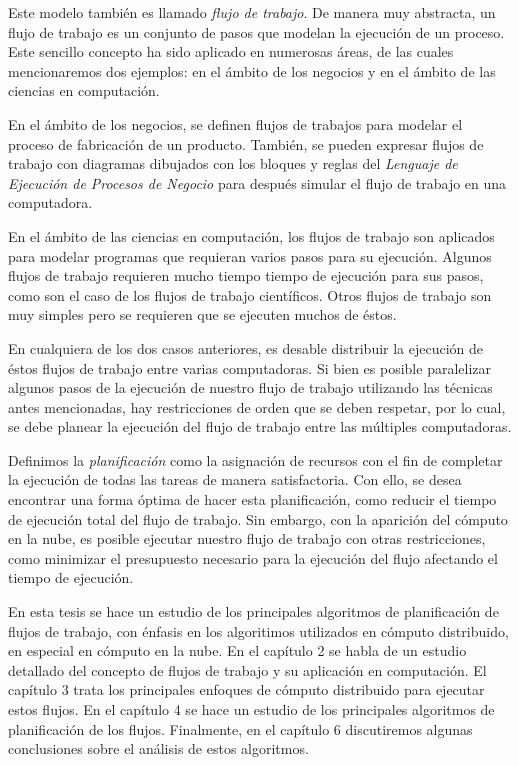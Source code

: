 Este modelo también es llamado \emph{flujo de trabajo}. De manera muy abstracta, un flujo de trabajo es un conjunto de pasos que modelan la ejecución de un proceso. Este sencillo concepto ha sido aplicado en numerosas áreas, de las cuales mencionaremos dos ejemplos: en el ámbito de los negocios y en el ámbito de las ciencias en computación. 

En el ámbito de los negocios, se definen flujos de trabajos para modelar el proceso de fabricación de un producto. También, se pueden expresar flujos de trabajo con diagramas dibujados con los bloques y reglas del \emph{Lenguaje de Ejecución de Procesos de Negocio} para después simular el flujo de trabajo en una computadora.

En el ámbito de las ciencias en computación, los flujos de trabajo son aplicados para modelar programas que requieran varios pasos para su ejecución. Algunos flujos de trabajo requieren mucho tiempo tiempo de ejecución para sus pasos, como son el caso de los flujos de trabajo científicos. Otros flujos de trabajo son muy simples pero  se requieren que se ejecuten muchos de éstos. 

En cualquiera de los dos casos anteriores, es desable distribuir la ejecución de éstos flujos de trabajo entre varias computadoras. Si bien es posible paralelizar algunos pasos de la ejecución de nuestro flujo de trabajo utilizando las técnicas antes mencionadas, hay restricciones de orden que se deben respetar, por lo cual, se debe planear la ejecución del flujo de trabajo entre las múltiples computadoras.

Definimos la \emph{planificación} como la asignación de recursos con el fin de completar la ejecución de todas las tareas de manera satisfactoria. Con ello, se desea encontrar una forma óptima de hacer esta planificación, como reducir el tiempo de ejecución total del flujo de trabajo. Sin embargo, con la aparición del cómputo en la nube, es posible ejecutar nuestro flujo de trabajo con otras restricciones, como minimizar el presupuesto necesario para la ejecución del flujo afectando el tiempo de ejecución.



En esta tesis se hace un estudio de los principales algoritmos de planificación de flujos de trabajo, con énfasis en los algoritimos utilizados en cómputo distribuido, en especial en cómputo en la nube. En el capítulo 2 se habla de un estudio detallado del concepto de flujos de trabajo y su aplicación en computación. El capítulo 3 trata los principales enfoques de cómputo distribuido para ejecutar estos flujos. En el capítulo 4 se hace un estudio de los principales algoritmos de planificación de los flujos. Finalmente, en el capítulo 6 discutiremos algunas conclusiones sobre el análisis de estos algoritmos.
